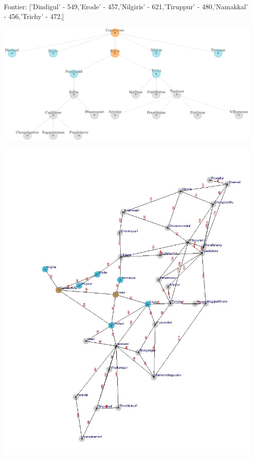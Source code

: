\documentclass[xcolor=table]{beamer}
\begin{document}
\begin{frame}
  { \tiny Fontier: ['Dindigul' - 549,'Erode' - 457,'Nilgiris' - 621,'Tiruppur' - 480,'Namakkal' - 456,'Trichy' - 472,] }
  \begin{center}
  \includegraphics[height=0.35\textheight]{../AStarNode/4-1.png}
  \end{center}
  \begin{center}
    \includegraphics[height=0.55\textheight]{../AStaroutput/tamilAStar2.jpg}
  \end{center}
\end{frame}
\end{document}
